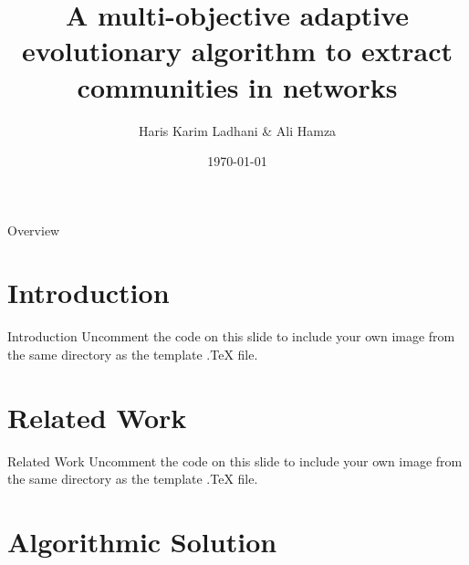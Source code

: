 \documentclass[aspectratio=169,xcolor=dvipsnames]{beamer}
\title[short title]{A multi-objective adaptive evolutionary algorithm to extract communities in networks} %
\author[Haris-Ali] {Haris Karim Ladhani \& Ali Hamza}
\institute[HU-CI] %
{
    CS 451 - Computational Intelligence \\
    Habib University %
}
\date{\today} %
\begin{document}
\begin{frame}
    \titlepage
\end{frame}

\begin{frame}{Overview}
    \tableofcontents
\end{frame}

\section{Introduction}

\begin{frame}{Introduction}
    Uncomment the code on this slide to include your own image from the same directory as the template .TeX file.
\end{frame}

\section{Related Work}

\begin{frame}{Related Work}
    Uncomment the code on this slide to include your own image from the same directory as the template .TeX file.
\end{frame}

\section{Algorithmic Solution}
\end{document}
